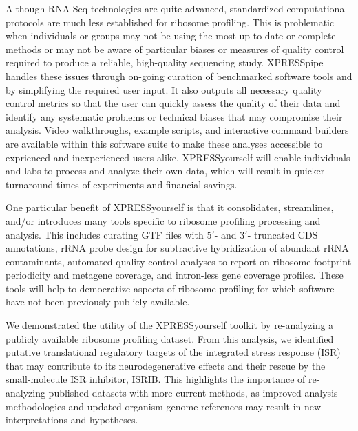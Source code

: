 \documentclass[10pt, oneside]{article}
\begin{document}
Although RNA-Seq technologies are quite advanced, standardized computational protocols are much less established for ribosome profiling. This is problematic when individuals or groups may not be using the most up-to-date or complete methods or may not be aware of particular biases or measures of quality control required to produce a reliable, high-quality sequencing study. XPRESSpipe handles these issues through on-going curation of benchmarked software tools and by simplifying the required user input. It also outputs all necessary quality control metrics so that the user can quickly assess the quality of their data and identify any systematic problems or technical biases that may compromise their analysis. Video walkthroughs, example scripts, and interactive command builders are available within this software suite to make these analyses accessible to exprienced and inexperienced users alike. XPRESSyourself will enable individuals and labs to process and analyze their own data, which will result in quicker turnaround times of experiments and financial savings.  \par

One particular benefit of XPRESSyourself is that it consolidates, streamlines, and/or introduces many tools specific to ribosome profiling processing and analysis. This includes curating GTF files with $5'$- and $3'$- truncated CDS annotations, rRNA probe design for subtractive hybridization of abundant rRNA contaminants, automated quality-control analyses to report on ribosome footprint periodicity and metagene coverage, and intron-less gene coverage profiles. These tools will help to democratize aspects of ribosome profiling for which software have not been previously publicly available. \par

We demonstrated the utility of the XPRESSyourself toolkit by re-analyzing a publicly available ribosome profiling dataset. From this analysis, we identified putative translational regulatory targets of the integrated stress response (ISR) that may contribute to its neurodegenerative effects and their rescue by the small-molecule ISR inhibitor, ISRIB. This highlights the importance of re-analyzing published datasets with more current methods, as improved analysis methodologies and updated organism genome references may result in new interpretations and hypotheses. \par
\end{document}
